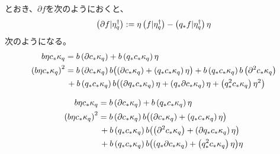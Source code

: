 {\begin{todo}[ここまで]
\begin{itemize}
			とおき、$\partial f$を次のようにおくと、
			\begin{equation*}\begin{split}
				\left({\partial f|\eta_q^\dag}\right) 
				:= \eta\left({f|\eta_q^\dag}\right)-\left({q_*f|\eta_q^\dag}\right)\eta
			\end{split}\end{equation*}
			次のようになる。
			\begin{equation*}\begin{split}
				b\eta c_*\kappa_q 
				&= b\left({\partial c_*\kappa_q}\right) + b\left({q_*c_*\kappa_q}\right)\eta \\
				\left({b\eta c_*\kappa_q}\right)^2
				&= b\left({\partial c_*\kappa_q}\right)b\bigl({\left({\partial c_*\kappa_q}\right)
					+ \left({q_*c_*\kappa_q}\right)\eta}\bigr) 
					+ b\left({q_*c_*\kappa_q}\right)b\left({\partial^2 c_*\kappa_q}\right) \\
				&\,+ b\left({q_*c_*\kappa_q}\right)b\bigl({\left({\partial q_*c_*\kappa_q}\right)\eta
					+ \left({q_*\partial c_*\kappa_q}\right)\eta
					+ \left({q_*^2c_*\kappa_q}\right)\eta^2}\bigr) \\
			\end{split}\end{equation*}

			\begin{equation*}\begin{split}
				b\eta c_*\kappa_q 
				&= b\left({\partial c_*\kappa_q}\right) + b\left({q_*c_*\kappa_q}\right)\eta \\
				\left({b\eta c_*\kappa_q}\right)^2
				&= b\left({\partial c_*\kappa_q}\right)b\bigl({\left({\partial c_*\kappa_q}\right)
					+ \left({q_*c_*\kappa_q}\right)\eta}\bigr) \\
				&\,+ b\left({q_*c_*\kappa_q}\right)b\bigl({\left({\partial^2 c_*\kappa_q}\right)
					+ \left({\partial q_*c_*\kappa_q}\right)\eta}\bigr) \\
				&\,+ b\left({q_*c_*\kappa_q}\right)b\bigl({\left({q_*\partial c_*\kappa_q}\right)
					+ \left({q_*^2c_*\kappa_q}\right)\eta}\bigr)\eta \\
			\end{split}\end{equation*}


\end{itemize}
\end{todo}}
